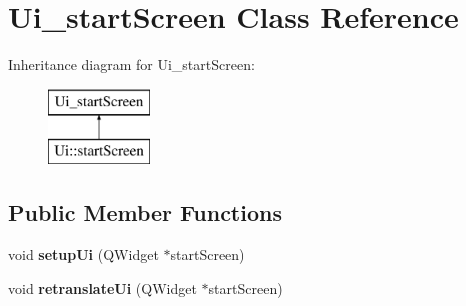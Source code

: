\hypertarget{class_ui__start_screen}{}\section{Ui\+\_\+start\+Screen Class Reference}
\label{class_ui__start_screen}
Inheritance diagram for Ui\+\_\+start\+Screen\+:\begin{figure}[H]
\begin{center}
\leavevmode
\includegraphics[height=2.000000cm]{class_ui__start_screen}
\end{center}
\end{figure}
\subsection*{Public Member Functions}
\begin{DoxyCompactItemize}
\item 
\mbox{\label{class_ui__start_screen_a65bb6043706a33b91a8c3c54db5f30c7}} 
void {\bfseries setup\+Ui} (Q\+Widget $\ast$start\+Screen)
\item 
\mbox{\label{class_ui__start_screen_a02b30ff925cdf7a4403b57e9fe3a41ac}} 
void {\bfseries retranslate\+Ui} (Q\+Widget $\ast$start\+Screen)
\end{DoxyCompactItemize}
